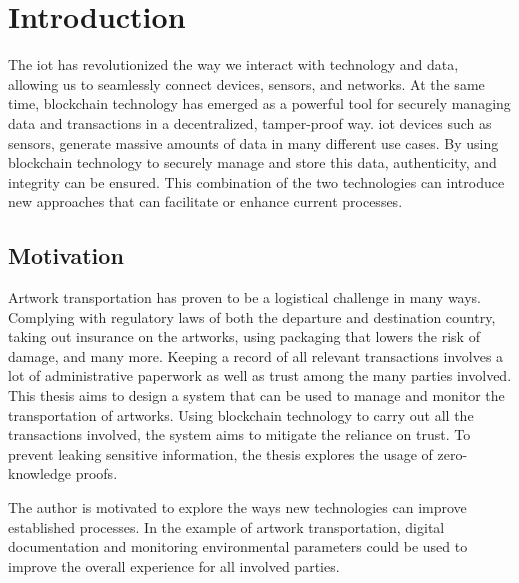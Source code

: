 \chapter{Introduction}
The \gls{iot} has revolutionized the way we interact with technology and data, allowing us to seamlessly connect devices, sensors, and networks. At the same time, blockchain technology has emerged as a powerful tool for securely managing data and transactions in a decentralized, tamper-proof way. \gls{iot} devices such as sensors, generate massive amounts of data in many different use cases. By using blockchain technology to securely manage and store this data, authenticity, and integrity can be ensured. This combination of the two technologies can introduce new approaches that can facilitate or enhance current processes.

\section{Motivation}
Artwork transportation has proven to be a logistical challenge in many ways. Complying with regulatory laws of both the departure and destination country, taking out insurance on the artworks, using packaging that lowers the risk of damage, and many more. Keeping a record of all relevant transactions involves a lot of administrative paperwork as well as trust among the many parties involved. This thesis aims to design a system that can be used to manage and monitor the transportation of artworks. Using blockchain technology to carry out all the transactions involved, the system aims to mitigate the reliance on trust. To prevent leaking sensitive information, the thesis explores the usage of zero-knowledge proofs.

The author is motivated to explore the ways new technologies can improve established processes. In the example of artwork transportation, digital documentation and monitoring environmental parameters could be used to improve the overall experience for all involved parties. 

